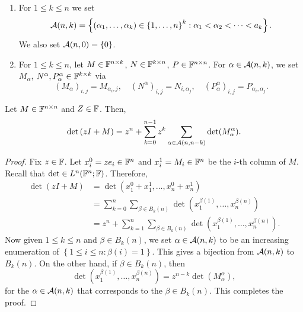 \documentclass[a4paper]{article}
\renewcommand{\sumk}{\sum_{k=0}}
\begin{document}
\begin{defi}
  \begin{enumerate}
    \item For $1 \leq k \leq n$ we set
          \[
            \mathcal{A}(n, k) = \left\{ (\alpha_1, \dots, \alpha_k)
            \in \left\{ 1, \dots, n \right\}^k :
            \alpha_1 < \alpha_2 < \dots < a_k \right\}.
          \]
          We also set $\mathcal{A}(n, 0) = \left\{ 0 \right\}$.

    \item For $1 \leq k \leq n$, let $M \in \mathbb{F}^{n \times k}$, $N \in \mathbb{F}^{k
          \times n}$, $P \in \mathbb{F}^{n \times n}$. For $\alpha \in \mathcal{A}(n,
          k)$, we set $M_\alpha$, $N^\alpha, P_\alpha^\alpha \in \mathbb{F}^{k
          \times k}$ via
          \[
            (M_\alpha)_{i, j} = M_{\alpha_i, j}, \quad
            (N^\alpha)_{i, j} = N_{i, \alpha_j}, \quad
            (P_\alpha^\alpha)_{i, j} = P_{\alpha_i, \alpha_j}.
          \]
  \end{enumerate}
\end{defi}

\begin{thm}
  Let $M \in \mathbb{F}^{n \times n}$ and $Z \in \mathbb{F}$. Then,
  \[
    \det \left( zI + M \right) = z^n + \sumk^{n-1}
    z^k \sum_{\alpha \in \acal(n, n - k)} \det(M_\alpha^\alpha).
  \]
\end{thm}

\begin{proof}
  Fix $z \in \mathbb{F}$. Let $x_i^0 = z e_i \in \mathbb{F}^n$ and $x_i^1 = M_i \in \mathbb{F}^n$
  be the $i$-th column of $M$. Recall that $\det \in L^n (\mathbb{F}^n ; \mathbb{F})$.
  Therefore,
  \[
    \begin{aligned}
      \det (z I + M)
       & = \det (x_1^0 + x_1^1, \dots, x_n^0 + x_n^1) \\
       & = \sum_{k=0}^n \sum_{\beta \in B_k(n)}
      \det (x_1^{\beta(1)}, \dots, x_n^{\beta(n)})    \\
       & = z^n + \sum_{k=1}^n \sum_{\beta \in B_k(n)}
      \det (x_1^{\beta(1)}, \dots, x_n^{\beta(n)}).
    \end{aligned}
  \]
  Now given $1 \leq k \leq n$ and $\beta \in B_k(n)$, we set $\alpha \in
  \mathcal{A}(n, k)$ to be an increasing enumeration of $\left\{ 1 \leq i \leq n
  : \beta(i) = 1 \right\}$. This gives a bijection from $\mathcal{A}(n, k)$ to
  $B_k(n)$. On the other hand, if $\beta \in B_k(n)$, then
  \[
    \det (x_1^{\beta(1)}, \dots, x_n^{\beta(n)})
    = z^{n - k} \det(M_\alpha^\alpha),
  \]
  for the $\alpha \in \mathcal{A}(n, k)$ that corresponds to the $\beta \in
  B_k(n)$. This completes the proof.
\end{proof}
\end{document}
